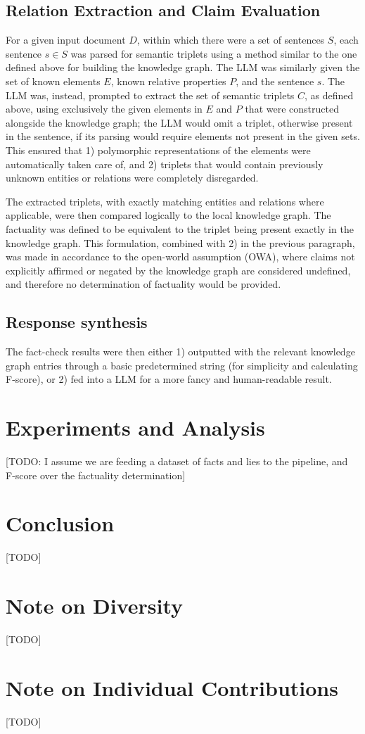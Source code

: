 \documentclass[11pt]{article}
\begin{document}
\subsection{Relation Extraction and Claim Evaluation}
For a given input document $D$, within which there were a set of sentences $S$, each sentence $s\in S$ was parsed for semantic triplets using a method similar to the one defined above for building the knowledge graph. The LLM was similarly given the set of known elements $E$, known relative properties $P$, and the sentence $s$. The LLM was, instead, prompted to extract the set of semantic triplets $C$, as defined above, using exclusively the given elements in $E$ and $P$ that were constructed alongside the knowledge graph; the LLM would omit a triplet, otherwise present in the sentence, if its parsing would require elements not present in the given sets. This ensured that 1) polymorphic representations of the elements were automatically taken care of, and 2) triplets that would contain previously unknown entities or relations were completely disregarded. 

The extracted triplets, with exactly matching entities and relations where applicable, were then compared logically to the local knowledge graph. The factuality was defined to be equivalent to the triplet being present exactly in the knowledge graph. This formulation, combined with 2) in the previous paragraph, was made in accordance to the open-world assumption (OWA), where claims not explicitly affirmed or negated by the knowledge graph are considered undefined, and therefore no determination of factuality would be provided.

\subsection{Response synthesis}
The fact-check results were then either 1) outputted with the relevant knowledge graph entries through a basic predetermined string (for simplicity and calculating F-score), or 2) fed into a LLM for a more fancy and human-readable result. 

\section{Experiments and Analysis}
[TODO: I assume we are feeding a dataset of facts and lies to the pipeline, and F-score over the factuality determination]

\section{Conclusion}
[TODO]

\section*{Note on Diversity}
[TODO]

\section*{Note on Individual Contributions}
[TODO]

%

\end{document}
